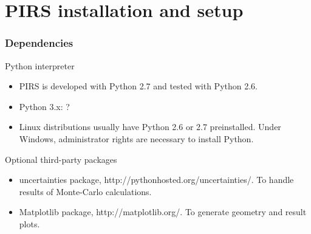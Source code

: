 \section{PIRS installation and setup}
\begin{frame}[fragile]
    \frametitle{Dependencies}
    \begin{block}{Python interpreter}
    \begin{itemize}
        \item PIRS is developed with Python 2.7 and tested with Python 2.6.
        \item Python 3.x: ?
        \item Linux distributions usually have Python 2.6 or 2.7 preinstalled. Under Windows, administrator rights are necessary to install Python.
    \end{itemize}
    \end{block}

    \begin{block}{Optional third-party packages}
    \begin{itemize}

        \item uncertainties package, http://pythonhosted.org/uncertainties/. To handle results of 
    Monte-Carlo calculations.

        \item Matplotlib package, http://matplotlib.org/. To generate geometry and result plots.
    \end{itemize}
    \end{block}
\end{frame}

